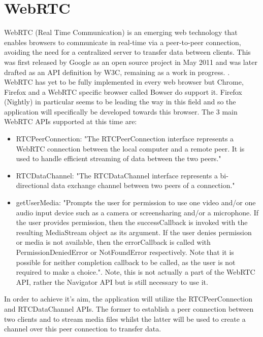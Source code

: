 \documentclass[]{report}
\begin{document}
\section{WebRTC}			
	WebRTC (Real Time Communication) is an emerging web technology that enables browsers to communicate in real-time via a peer-to-peer connection, avoiding the need for a centralized server to transfer data between clients. This was first released by Google as an open source project in May 2011 \cite{Google WebRTC Release} and was later drafted as an API definition by W3C, remaining as a work in progress. \cite{W3C WebRTC Definition}. WebRTC has yet to be fully implemented in every web browser but Chrome, Firefox and a WebRTC specific browser called Bowser do support it. Firefox (Nightly) in particular seems to be leading the way in this field and so the application will specifically be developed towards this browser\cite{WebRTC browser support}.
	The 3 main WebRTC APIs supported at this time are:
		\begin{itemize}
			\item RTCPeerConnection:
			"The RTCPeerConnection interface represents a WebRTC connection between the local computer and a remote peer. It is used to handle efficient streaming of data between the two peers." \cite{Mozilla Web API}
			\item RTCDataChannel:
			"The RTCDataChannel interface represents a bi-directional data exchange channel between two peers of a connection." \cite{Mozilla Web API}
			\item getUserMedia:
			"Prompts the user for permission to use one video and/or one audio input device such as a camera or screensharing and/or a microphone. If the user provides permission, then the successCallback is invoked with the resulting MediaStream object as its argument. If the user denies permission or media is not available, then the errorCallback is called with PermissionDeniedError or NotFoundError respectively. Note that it is possible for neither completion callback to be called, as the user is not required to make a choice."\cite{Mozilla Web API}. Note, this is not actually a part of the WebRTC API, rather the Navigator API but is still necessary to use it.
		\end{itemize}
		
	In order to achieve it's aim, the application will utilize the RTCPeerConnection and RTCDataChannel APIs. The former to establish a peer connection between two clients and to stream media files whilst the latter will be used to create a channel over this peer connection to transfer data.
			
\end{document}
